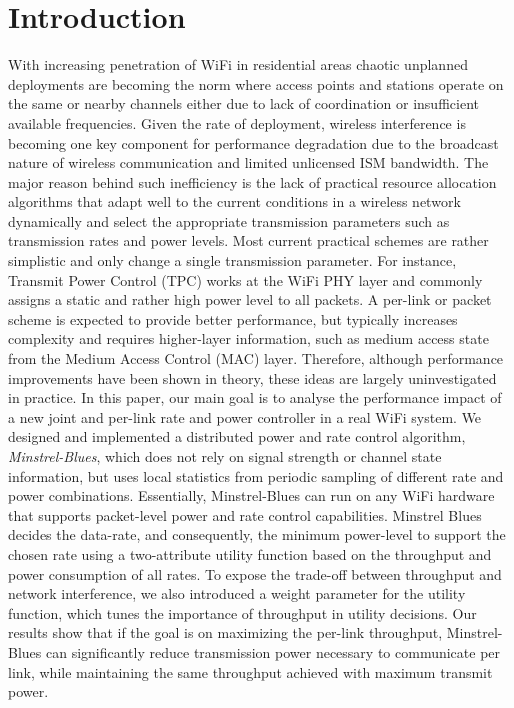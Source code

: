 \documentclass{sig-alternate}
\begin{document}
	\section{Introduction}
	With increasing penetration of WiFi in residential areas chaotic
	unplanned deployments are becoming the norm where access points and
	stations operate on the same or nearby channels either due to lack
	of coordination or insufficient	available frequencies.
	Given the rate of deployment, wireless interference is becoming one key
	component for performance degradation due to the broadcast nature of
	wireless communication and limited unlicensed ISM bandwidth.
	The major reason behind such inefficiency is the lack of practical
	resource allocation algorithms that adapt well to the current conditions
	in a wireless network dynamically and select the appropriate
	transmission parameters such as transmission rates and 	power levels.
	Most current practical schemes are rather simplistic and only change a
	single transmission parameter.
	For instance, Transmit Power Control (TPC) works at the WiFi PHY layer
	and commonly assigns a static and rather high power level to all packets.
	A per-link or packet scheme is expected to provide better performance,
	but typically increases complexity and requires	higher-layer information,
	such as medium access state from the Medium Access Control (MAC) layer.
	Therefore, although performance improvements have been shown in theory,
	these ideas are largely uninvestigated in practice.
	In this paper, our main goal is to analyse the performance impact of a
	new joint and per-link rate and power controller in a real WiFi system.
	We designed and implemented a distributed power and rate control
	algorithm, \textit{Minstrel-Blues}, which does not rely on signal
	strength or channel state information, but uses local statistics from
	periodic sampling of different rate and power combinations.  
	Essentially, Minstrel-Blues can run on any WiFi hardware that supports
	packet-level power and rate control capabilities.
	Minstrel Blues decides the data-rate, and consequently, the minimum
	power-level to support the chosen rate using a two-attribute utility
	function based on the throughput and power consumption of all rates.
	To expose the trade-off between throughput and network interference,
	we also introduced a weight parameter for the utility function, which
	tunes the importance of throughput in utility decisions.
	Our results show that if the goal is on maximizing the per-link
	throughput, Minstrel-Blues can significantly reduce transmission power
	necessary to communicate per link, while maintaining the same throughput
	achieved with maximum transmit power.
\end{document}
